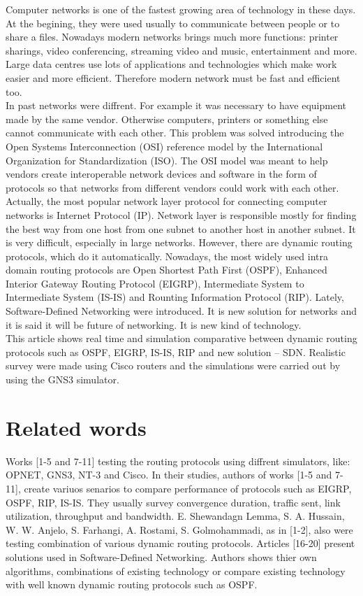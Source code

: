 \documentclass[conference,compsoc]{IEEEtran}
\begin{document}
Computer networks is one of the fastest growing area of technology in these days. At the begining, they were used usually to communicate between people or to share a files. Nowadays modern networks brings much more functions: printer sharings, video conferencing, streaming video and music, entertainment and more. Large data centres use lots of applications and technologies which make work easier and more efficient. Therefore modern network must be fast and efficient too.
\\
In past networks were diffrent. For example it was necessary to have equipment made by the same vendor. Otherwise computers, printers or something else cannot communicate with each other. This problem was solved introducing the Open Systems Interconnection (OSI) reference model by the International Organization for Standardization (ISO). The OSI model was meant to help vendors create interoperable network devices and software in the form of protocols so that networks from different vendors could work with each other.
\\
Actually, the most popular network layer protocol for connecting computer networks is Internet Protocol (IP). Network layer is responsible mostly for finding the best way from one host from one subnet to another host in another subnet. It is very difficult, especially in large networks. However, there are dynamic routing protocols, which do it automatically. Nowadays, the most widely used intra domain routing protocols are Open Shortest Path First (OSPF), Enhanced Interior Gateway Routing Protocol (EIGRP), Intermediate System to Intermediate System (IS-IS) and Rounting Information Protocol (RIP). Lately, Software-Defined Networking were introduced. It is new solution for networks and it is said it will be future of networking. It is new kind of technology.
\\
This article shows real time and simulation comparative between dynamic routing protocols such as OSPF, EIGRP, IS-IS, RIP and new solution – SDN. Realistic survey were made using Cisco routers and the simulations were carried out by using the GNS3 simulator.

\section{Related words}

Works [1-5 and 7-11] testing the routing protocols using diffrent simulators, like: OPNET, GNS3, NT-3 and Cisco. In their studies, authors of works [1-5 and 7-11], create variuos senarios to compare performance of protocols such as EIGRP, OSPF, RIP, IS-IS. They usually survey convergence duration, traffic sent, link utilization, throughput and bandwidth. E. Shewandagn Lemma, S. A. Hussain, W. W. Anjelo, S. Farhangi, A. Rostami, S. Golmohammadi, as in [1-2], also were testing combination of various dynamic routing protocols. Articles [16-20] present solutions used in Software-Defined Networking. Authors shows thier own algorithms, combinations of existing technology or compare existing technology with well known dynamic routing protocols such as OSPF.
\end{document}
